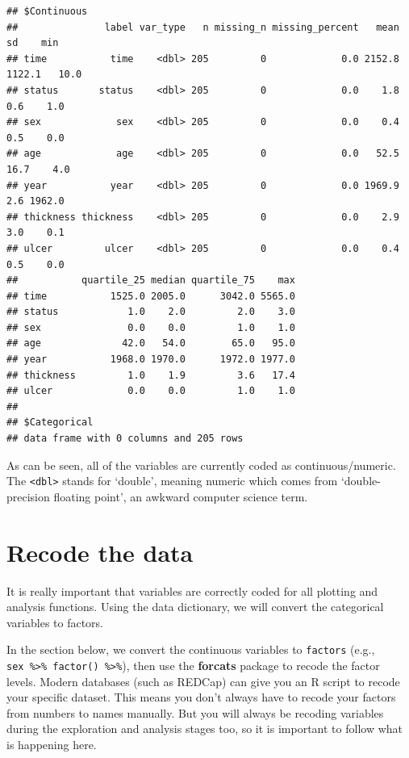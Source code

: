 \documentclass[
  12pt,
  krantz2]{krantz}
\makeatletter
\newenvironment{Shaded}{\begin{snugshade}}{\end{snugshade}}
\newcommand{\KeywordTok}[1]{\textcolor[rgb]{0.13,0.29,0.53}{\textbf{#1}}}
\newcommand{\NormalTok}[1]{#1}
\newcommand{\OperatorTok}[1]{\textcolor[rgb]{0.81,0.36,0.00}{\textbf{#1}}}
\newcommand{\StringTok}[1]{\textcolor[rgb]{0.31,0.60,0.02}{#1}}
\newenvironment{kframe}{%
\medskip{}
\setlength{\fboxsep}{.8em}
 \def\at@end@of@kframe{}%
 \ifinner\ifhmode%
  \def\at@end@of@kframe{\end{minipage}}%
  \begin{minipage}{\columnwidth}%
 \fi\fi%
 \def\FrameCommand##1{\hskip\@totalleftmargin \hskip-\fboxsep
 \colorbox{shadecolor}{##1}\hskip-\fboxsep
     \hskip-\linewidth \hskip-\@totalleftmargin \hskip\columnwidth}%
 \MakeFramed {\advance\hsize-\width
   \@totalleftmargin\z@ \linewidth\hsize
   \@setminipage}}%
 {\par\unskip\endMakeFramed%
 \at@end@of@kframe}
\renewenvironment{Shaded}{\begin{kframe}}{\end{kframe}}
\makeatother
\begin{document}
\begin{Shaded}
\end{Shaded}

\begin{verbatim}
## $Continuous
##               label var_type   n missing_n missing_percent   mean     sd    min
## time           time    <dbl> 205         0             0.0 2152.8 1122.1   10.0
## status       status    <dbl> 205         0             0.0    1.8    0.6    1.0
## sex             sex    <dbl> 205         0             0.0    0.4    0.5    0.0
## age             age    <dbl> 205         0             0.0   52.5   16.7    4.0
## year           year    <dbl> 205         0             0.0 1969.9    2.6 1962.0
## thickness thickness    <dbl> 205         0             0.0    2.9    3.0    0.1
## ulcer         ulcer    <dbl> 205         0             0.0    0.4    0.5    0.0
##           quartile_25 median quartile_75    max
## time           1525.0 2005.0      3042.0 5565.0
## status            1.0    2.0         2.0    3.0
## sex               0.0    0.0         1.0    1.0
## age              42.0   54.0        65.0   95.0
## year           1968.0 1970.0      1972.0 1977.0
## thickness         1.0    1.9         3.6   17.4
## ulcer             0.0    0.0         1.0    1.0
## 
## $Categorical
## data frame with 0 columns and 205 rows
\end{verbatim}

As can be seen, all of the variables are currently coded as continuous/numeric.
The \texttt{\textless{}dbl\textgreater{}} stands for `double', meaning numeric which comes from `double-precision floating point', an awkward computer science term.

\hypertarget{chap08-recode}{%
\section{Recode the data}\label{chap08-recode}}

It is really important that variables are correctly coded for all plotting and analysis functions.
Using the data dictionary, we will convert the categorical variables to factors.

In the section below, we convert the continuous variables to \texttt{factors} (e.g., \texttt{sex\ \%\textgreater{}\%\ factor()\ \%\textgreater{}\%}), then use the \textbf{forcats} package to recode the factor levels.
Modern databases (such as REDCap) can give you an R script to recode your specific dataset.
This means you don't always have to recode your factors from numbers to names manually.
But you will always be recoding variables during the exploration and analysis stages too, so it is important to follow what is happening here.
\end{document}
